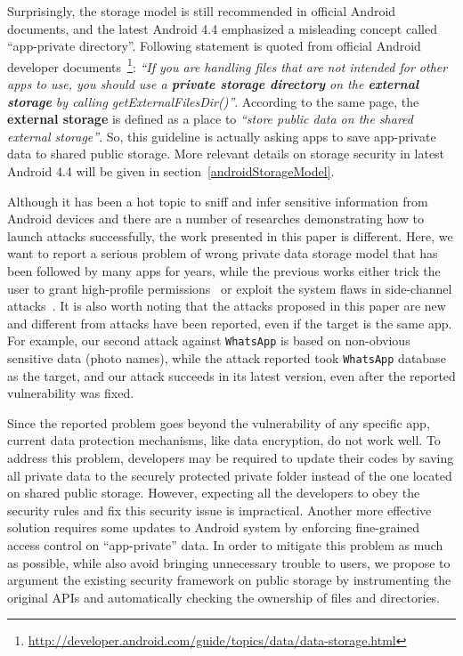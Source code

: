\documentclass{sig-alternate}
\begin{document}
Surprisingly, the storage model is still recommended in official Android documents, and the latest Android 4.4 emphasized a misleading concept called ``app-private directory''. Following statement is quoted from official Android developer documents~\footnote{\url{http://developer.android.com/guide/topics/data/data-storage.html}}: \textit{
  ``If you are handling files that are not intended for other apps to use, you should use a {\bf private storage directory} on the {\bf external storage} by calling getExternalFilesDir()''}. According to the same page, the {\bf external storage} is defined as a place to \textit{``store public data on the shared external storage''}. So, this guideline is actually asking apps to save app-private data to shared public storage. More relevant details on storage security in latest Android 4.4 will be given in section~\ref{androidStorageModel}.



Although it has been a hot topic to sniff and infer sensitive information from Android devices and there are a number of researches demonstrating how to launch attacks successfully, the work presented in this paper is different. Here, we want to report a serious problem of wrong private data storage model that has been followed by many apps for years, while the previous works either trick the user to grant high-profile permissions~\cite{bugiel2012towards} or exploit the system flaws in side-channel attacks~\cite{jana2012memento}. It is also worth noting that the attacks proposed in this paper are new and different from attacks have been reported, even if the target is the same app. For example, our second attack against \texttt{WhatsApp} is based on non-obvious sensitive data (photo names), while the attack reported \cite{whatsappuserchat} took \texttt{WhatsApp} database as the target, and our attack succeeds in its latest version, even after the reported vulnerability was fixed.




Since the reported problem goes beyond the vulnerability of any specific app, current data protection mechanisms, like data encryption, do not work well. To address this problem, developers may be required to update their codes by saving all private data to the securely protected private folder instead of the one located on shared public storage. However, expecting all the developers to obey the security rules and fix this security issue is impractical. Another more effective solution requires some updates to Android system by enforcing fine-grained access control on ``app-private'' data. In order to mitigate this problem as much as possible, while also avoid bringing unnecessary trouble to users, we propose to argument the existing security framework on public storage by instrumenting the original APIs and automatically checking the ownership of files and directories.
\end{document}
